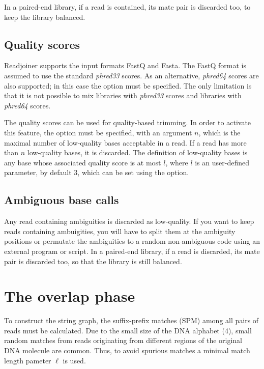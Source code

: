 \documentclass[12pt,titlepage]{article}
\newcommand{\minlen}{\ell}
\begin{document}
In a paired-end library, if a read is contained, its mate pair is
discarded too, to keep the library balanced.

\subsection{Quality scores}

Readjoiner supports the input formats FastQ and Fasta.
The FastQ format is assumed to use the standard \textit{phred33} scores.
As an alternative, \textit{phred64} scores are also supported; in this case
the option  must be specified. The only limitation is that
it is not possible to mix libraries with \textit{phred33} scores
and libraries with \textit{phred64} scores.

The quality scores can be used for quality-based trimming. In order to activate
this feature, the  option must be specified, with an
argument $n$, which is the maximal number of low-quality bases acceptable in a
read. If a read has more than $n$ low-quality bases, it is discarded. The
definition of low-quality bases is any base whose associated quality score
is at most $l$, where $l$ is an user-defined parameter, by default 3, which
can be set using the  option.

\subsection{Ambiguous base calls}

Any read containing ambiguities is discarded as low-quality.
If you want to keep reads containing ambuigities, you will have to split
them at the ambiguity positions or permutate the ambiguities to a
random non-ambiguous code using an external program or script.
In a paired-end library, if a read is discarded, its mate pair is
discarded too, so that the library is still balanced.


\section{The overlap phase}

To construct the string graph, the suffix-prefix matches (SPM) among all pairs
of reads must be calculated. Due to the small size of the DNA alphabet (4),
small random matches from reads originating from different regions of the
original DNA molecule are common. Thus, to avoid spurious matches a minimal
match length pameter $\minlen$ is used.
\end{document}
